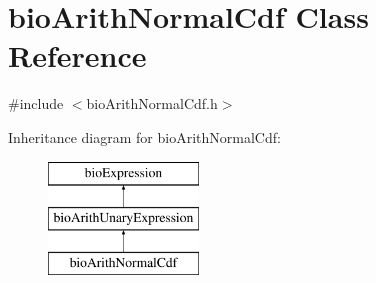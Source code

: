 \hypertarget{classbio_arith_normal_cdf}{}\section{bio\+Arith\+Normal\+Cdf Class Reference}
\label{classbio_arith_normal_cdf}


{\ttfamily \#include $<$bio\+Arith\+Normal\+Cdf.\+h$>$}

Inheritance diagram for bio\+Arith\+Normal\+Cdf\+:\begin{figure}[H]
\begin{center}
\leavevmode
\includegraphics[height=3.000000cm]{classbio_arith_normal_cdf}
\end{center}
\end{figure}
